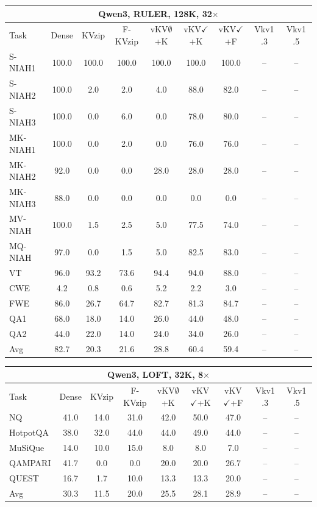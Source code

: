 \begin{tabular}{lcccccccc}
\toprule
\multicolumn{9}{c}{Qwen3, RULER, 128K, 32$\times$} \\
\midrule
Task & Dense & KVzip & F-KVzip & vKV$\emptyset$+K & vKV$\checkmark$+K & vKV$\checkmark$+F & Vkv1 .3 & Vkv1 .5 \\
\midrule
S-NIAH1 & 100.0 & 100.0 & 100.0 & 100.0 & 100.0 & 100.0 & -- & -- \\
S-NIAH2 & 100.0 & 2.0 & 2.0 & 4.0 & 88.0 & 82.0 & -- & -- \\
S-NIAH3 & 100.0 & 0.0 & 6.0 & 0.0 & 78.0 & 80.0 & -- & -- \\
MK-NIAH1 & 100.0 & 0.0 & 2.0 & 0.0 & 76.0 & 76.0 & -- & -- \\
MK-NIAH2 & 92.0 & 0.0 & 0.0 & 28.0 & 28.0 & 28.0 & -- & -- \\
MK-NIAH3 & 88.0 & 0.0 & 0.0 & 0.0 & 0.0 & 0.0 & -- & -- \\
MV-NIAH & 100.0 & 1.5 & 2.5 & 5.0 & 77.5 & 74.0 & -- & -- \\
MQ-NIAH & 97.0 & 0.0 & 1.5 & 5.0 & 82.5 & 83.0 & -- & -- \\
VT & 96.0 & 93.2 & 73.6 & 94.4 & 94.0 & 88.0 & -- & -- \\
CWE & 4.2 & 0.8 & 0.6 & 5.2 & 2.2 & 3.0 & -- & -- \\
FWE & 86.0 & 26.7 & 64.7 & 82.7 & 81.3 & 84.7 & -- & -- \\
QA1 & 68.0 & 18.0 & 14.0 & 26.0 & 44.0 & 48.0 & -- & -- \\
QA2 & 44.0 & 22.0 & 14.0 & 24.0 & 34.0 & 26.0 & -- & -- \\
\midrule
Avg & 82.7 & 20.3 & 21.6 & 28.8 & 60.4 & 59.4 & -- & -- \\
\bottomrule
\end{tabular}
\vspace{0.8em}

\begin{tabular}{lcccccccc}
\toprule
\multicolumn{9}{c}{Qwen3, LOFT, 32K, 8$\times$} \\
\midrule
Task & Dense & KVzip & F-KVzip & vKV$\emptyset$+K & vKV$\checkmark$+K & vKV$\checkmark$+F & Vkv1 .3 & Vkv1 .5 \\
\midrule
NQ & 41.0 & 14.0 & 31.0 & 42.0 & 50.0 & 47.0 & -- & -- \\
HotpotQA & 38.0 & 32.0 & 44.0 & 44.0 & 49.0 & 44.0 & -- & -- \\
MuSiQue & 14.0 & 10.0 & 15.0 & 8.0 & 8.0 & 7.0 & -- & -- \\
QAMPARI & 41.7 & 0.0 & 0.0 & 20.0 & 20.0 & 26.7 & -- & -- \\
QUEST & 16.7 & 1.7 & 10.0 & 13.3 & 13.3 & 20.0 & -- & -- \\
\midrule
Avg & 30.3 & 11.5 & 20.0 & 25.5 & 28.1 & 28.9 & -- & -- \\
\bottomrule
\end{tabular}
\vspace{0.8em}

